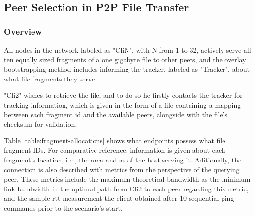 \subsection{Peer Selection in P2P File Transfer}

\label{ssec:scenario1}

\subsubsection{Overview}

    All nodes in the network labeled as "CliN", with N from 1 to 32, actively serve all ten equally sized fragments of a one gigabyte file to other peers, and the overlay bootstrapping method includes informing the tracker, labeled as "Tracker", about what file fragments they serve.

    "Cli2" wishes to retrieve the file, and to do so he firstly contacts the tracker for tracking information, which is given in the form of a file containing a mapping between each fragment \gls{id} and the available peers, alongside with the file's checksum for validation.

    Table \ref{table:fragment-allocations} shows what endpoints possess what file fragment IDs.
    For comparative reference, information is given about each fragment's location, i.e., the area and \gls{as} of the host serving it.
    Aditionally, the connection is also described with metrics from the perspective of the querying peer.
    These metrics include the maximum theoretical bandwidth as the minimum link bandwidth in the optimal path from Cli2 to each peer regarding this metric, and the sample \gls{rtt} measurement the client obtained after 10 sequential ping commands prior to the scenario's start.

